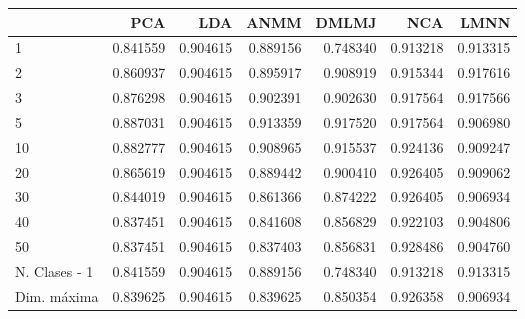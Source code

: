 \begin{tabular}{lrrrrrr}
\toprule
{} &       PCA &       LDA &      ANMM &     DMLMJ &       NCA &      LMNN \\
\midrule
1             &  0.841559 &  0.904615 &  0.889156 &  0.748340 &  0.913218 &  0.913315 \\
2             &  0.860937 &  0.904615 &  0.895917 &  0.908919 &  0.915344 &  0.917616 \\
3             &  0.876298 &  0.904615 &  0.902391 &  0.902630 &  0.917564 &  0.917566 \\
5             &  0.887031 &  0.904615 &  0.913359 &  0.917520 &  0.917564 &  0.906980 \\
10            &  0.882777 &  0.904615 &  0.908965 &  0.915537 &  0.924136 &  0.909247 \\
20            &  0.865619 &  0.904615 &  0.889442 &  0.900410 &  0.926405 &  0.909062 \\
30            &  0.844019 &  0.904615 &  0.861366 &  0.874222 &  0.926405 &  0.906934 \\
40            &  0.837451 &  0.904615 &  0.841608 &  0.856829 &  0.922103 &  0.904806 \\
50            &  0.837451 &  0.904615 &  0.837403 &  0.856831 &  0.928486 &  0.904760 \\
N. Clases - 1 &  0.841559 &  0.904615 &  0.889156 &  0.748340 &  0.913218 &  0.913315 \\
Dim. máxima   &  0.839625 &  0.904615 &  0.839625 &  0.850354 &  0.926358 &  0.906934 \\
\bottomrule
\end{tabular}
